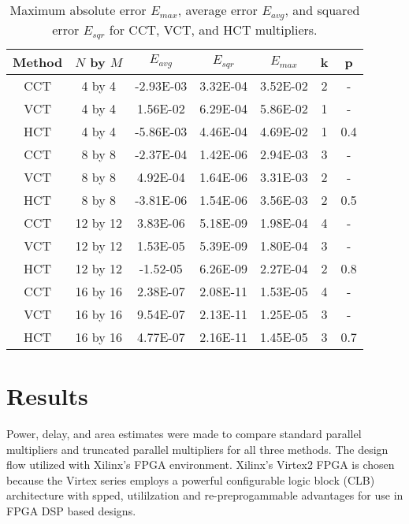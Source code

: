 \begin{table*} [ht]
\centering
\begin{tabular}{|c|c|c|c|c|c|c|} \hline
Method      & $N$ by $M$ & $E_{avg}$ & $E_{sqr}$ & $E_{max}$ & k & p \\ \hline \hline
CCT         &  4 by 4   & -2.93E-03 & 3.32E-04 & 3.52E-02 & 2 & - 
\\ \hline
VCT         & 4 by 4    &  1.56E-02 & 6.29E-04 & 5.86E-02 & 1 & -
\\ \hline
HCT         & 4 by 4    & -5.86E-03 & 4.46E-04 & 4.69E-02 & 1 & 0.4
\\ \hline \hline
CCT         &  8 by 8   & -2.37E-04 & 1.42E-06 & 2.94E-03 & 3 & -
\\ \hline
VCT         & 8 by 8    &  4.92E-04 & 1.64E-06 & 3.31E-03 & 2 & -
\\ \hline
HCT         & 8 by 8    & -3.81E-06 & 1.54E-06 & 3.56E-03 & 2 & 0.5
\\ \hline \hline
CCT         &  12 by 12 & 3.83E-06 & 5.18E-09 & 1.98E-04 & 4 & -
\\ \hline
VCT         & 12 by 12  &  1.53E-05 & 5.39E-09 & 1.80E-04 & 3 & -
\\ \hline
HCT         & 12 by 12  & -1.52-05 & 6.26E-09 & 2.27E-04 & 2 & 0.8
\\ \hline \hline
CCT         &  16 by 16 & 2.38E-07 & 2.08E-11 & 1.53E-05 & 4 & -
\\ \hline
VCT         & 16 by 16  &  9.54E-07 & 2.13E-11 & 1.25E-05 & 3 & -
\\ \hline
HCT         & 16 by 16  &  4.77E-07 & 2.16E-11 & 1.45E-05 & 3 & 0.7
\\ \hline \hline
\end{tabular}
\caption{Maximum absolute error $E_{max}$, average error $E_{avg}$, 
and squared error $E_{sqr}$ for CCT, VCT, and HCT multipliers.}
\end{table*}

\section{Results}

Power, delay, and area estimates were made to compare 
standard parallel multipliers and truncated parallel multipliers for
all three methods. 
The design flow utilized with Xilinx's FPGA environment.  Xilinx's Virtex2
FPGA is chosen because the Virtex series employs a powerful configurable logic
block (CLB) architecture with spped, utililzation and re-preprogammable
advantages for use in FPGA DSP based designs.


